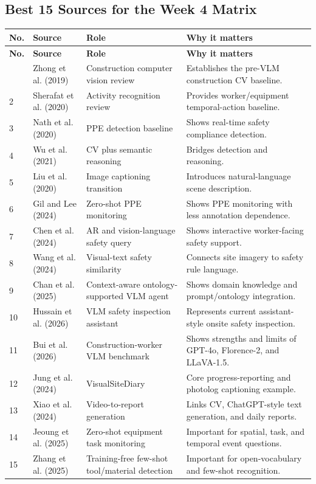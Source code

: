\documentclass[10pt,letterpaper]{article}
\begin{document}
\subsection{Best 15 Sources for the Week 4 Matrix}

\begin{longtable}{L{0.7cm} L{4.0cm} L{4.7cm} L{5.0cm}}
\toprule
{}
\textbf{No.} & \textbf{Source} & \textbf{Role} & \textbf{Why it matters}\\
\midrule
\endfirsthead
\toprule
{}
\textbf{No.} & \textbf{Source} & \textbf{Role} & \textbf{Why it matters}\\
\midrule
\endhead
\bottomrule
{} & Zhong et al. (2019) & Construction computer vision review & Establishes the pre-VLM construction CV baseline.\\
2 & Sherafat et al. (2020) & Activity recognition review & Provides worker/equipment temporal-action baseline.\\
3 & Nath et al. (2020) & PPE detection baseline & Shows real-time safety compliance detection.\\
4 & Wu et al. (2021) & CV plus semantic reasoning & Bridges detection and reasoning.\\
5 & Liu et al. (2020) & Image captioning transition & Introduces natural-language scene description.\\
6 & Gil and Lee (2024) & Zero-shot PPE monitoring & Shows PPE monitoring with less annotation dependence.\\
7 & Chen et al. (2024) & AR and vision-language safety query & Shows interactive worker-facing safety support.\\
8 & Wang et al. (2024) & Visual-text safety similarity & Connects site imagery to safety rule language.\\
9 & Chan et al. (2025) & Context-aware ontology-supported VLM agent & Shows domain knowledge and prompt/ontology integration.\\
10 & Hussain et al. (2026) & VLM safety inspection assistant & Represents current assistant-style onsite safety inspection.\\
11 & Bui et al. (2026) & Construction-worker VLM benchmark & Shows strengths and limits of GPT-4o, Florence-2, and LLaVA-1.5.\\
12 & Jung et al. (2024) & VisualSiteDiary & Core progress-reporting and photolog captioning example.\\
13 & Xiao et al. (2024) & Video-to-report generation & Links CV, ChatGPT-style text generation, and daily reports.\\
14 & Jeoung et al. (2025) & Zero-shot equipment task monitoring & Important for spatial, task, and temporal event questions.\\
15 & Zhang et al. (2025) & Training-free few-shot tool/material detection & Important for open-vocabulary and few-shot recognition.\\
\end{longtable}
\end{document}
